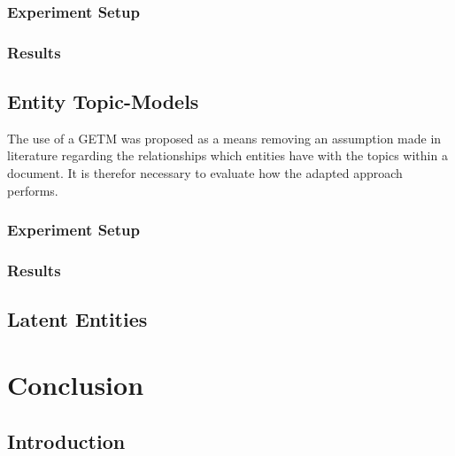 \documentclass[10pt]{report}
\begin{document}
\subsection{Experiment Setup}

\subsection{Results}

\section{Entity Topic-Models}
The use of a GETM was proposed as a means removing an assumption made in literature regarding the relationships which entities have with the topics within a document. It is therefor necessary to evaluate how the adapted approach performs.

\subsection{Experiment Setup}

\subsection{Results}

\section{Latent Entities}

%
%
%
%
\chapter{Conclusion}
\section{Introduction}

\renewcommand{\baselinestretch}{1.0}\normalsize


\end{document}
